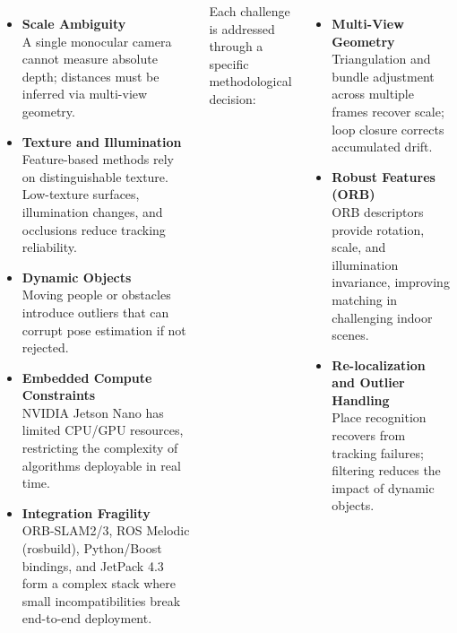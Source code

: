 \documentclass[25pt,a0paper, portrait]{tikzposter}
\begin{document}
\begin{columns}
{{\begin{itemize}
					\item \textbf{Scale Ambiguity}\\
					A single monocular camera cannot measure absolute depth; distances must be inferred via multi-view geometry.
					
					\item \textbf{Texture and Illumination}\\
					Feature-based methods rely on distinguishable texture. Low-texture surfaces, illumination changes, and occlusions reduce tracking reliability.
					
					\item \textbf{Dynamic Objects}\\
					Moving people or obstacles introduce outliers that can corrupt pose estimation if not rejected.
					
					\item \textbf{Embedded Compute Constraints}\\
					NVIDIA Jetson Nano has limited CPU/GPU resources, restricting the complexity of algorithms deployable in real time.
					
					\item \textbf{Integration Fragility}\\
					ORB-SLAM2/3, ROS Melodic (rosbuild), Python/Boost bindings, and JetPack 4.3 form a complex stack where small incompatibilities break end-to-end deployment.
				\end{itemize}
			}
			
			{
				Each challenge is addressed through a specific methodological decision:
				
				\vspace{0.2cm}
				\begin{itemize}
					\setlength{\itemsep}{3pt}
					\item \textbf{Multi-View Geometry}\\
					Triangulation and bundle adjustment across multiple frames recover scale; loop closure corrects accumulated drift.
					
					\item \textbf{Robust Features (ORB)}\\
					ORB descriptors provide rotation, scale, and illumination invariance, improving matching in challenging indoor scenes.
					
					\item \textbf{Re-localization and Outlier Handling}\\
					Place recognition recovers from tracking failures; filtering reduces the impact of dynamic objects.
					

\end{itemize}}}
\end{columns}
\end{document}
